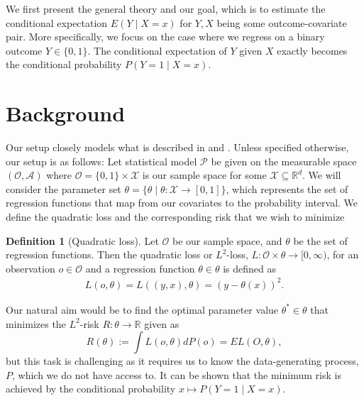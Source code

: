 \documentclass[11pt, a4paper]{article}
\theoremstyle{definition}
\newtheorem{definition}[theorem]{Definition}
\theoremstyle{remark}
\newcommand{\btheta}{\theta}
\begin{document}
We first present the general theory and our goal, which is to estimate the conditional expectation $ E(Y \mid X = x) $ for $ Y, X $ being some outcome-covariate pair. More specifically, we focus on the case where we regress on a binary outcome $ Y \in \{0,1\} $. The conditional expectation of $ Y $ given $ X $ exactly becomes the conditional probability $ P(Y = 1 \mid X = x) $.


\section{Background}

Our setup closely models what is described in \cite{vaart06} and \cite{laan03}. Unless specified otherwise, our setup is as follows:
Let statistical model $ \mathcal{P} $ be given on the measurable space $ (\mathcal{O}, \mathcal{A}) $ where $ \mathcal{O} = \{0,1\} \times \mathcal{X} $ is our sample space for some $ \mathcal{X} \subseteq \mathbb{R}^{d} $. 
We will consider the parameter set $ \btheta = \{\btheta \mid \btheta : \mathcal{X} \to [0,1]\} $, which represents the set of regression functions that map from our covariates to the probability interval. We define the quadratic loss and the corresponding risk that we wish to minimize 
\begin{definition}[Quadratic loss]
    Let $ \mathcal{O}  $ be our sample space, and $ \btheta $ be the set of regression functions. Then the quadratic loss or $ L^2 $-loss, $ L : \mathcal{O} \times \btheta \to [0, \infty) $, for an observation $ o \in \mathcal{O} $ and a regression function $ \btheta \in \btheta $ is defined as 
\begin{align*}
    L(o, \btheta) = L((y,x), \btheta) = (y - \btheta(x))^2.
\end{align*}
\end{definition}
Our natural aim would be to find the optimal parameter value $\btheta^* \in \btheta$ that minimizes the $L^2$-risk $R: \btheta \to \mathbb{R}$ given as 
\begin{equation} \label{l2risk}
    R(\btheta) := \int L(o, \btheta)  dP(o) = EL(O, \btheta),
\end{equation}
but this task is challenging as it requires us to know the data-generating process, $ P $, which we do not have access to. It can be shown that the minimum risk is achieved by the conditional probability $ x \mapsto P(Y = 1\mid X = x) $. 
\end{document}
